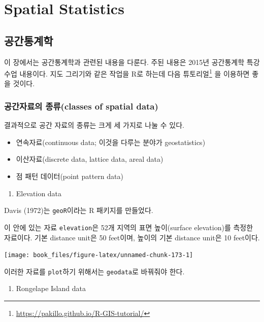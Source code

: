 \documentclass[b5paper,]{book}
\providecommand{\tightlist}{%
  \setlength{\itemsep}{0pt}\setlength{\parskip}{0pt}}
\let\rmarkdownfootnote\footnote%
\def\footnote{\protect\rmarkdownfootnote}
\renewcommand{\href}[2]{#2\footnote{\url{#1}}}
\theoremstyle{definition}
\theoremstyle{definition}
\theoremstyle{definition}
\theoremstyle{remark}
\begin{document}
\part{Spatial Statistics}\label{part-spatial-statistics}

\chapter{공간통계학}\label{spatial}

이 장에서는 공간통계학과 관련된 내용을 다룬다. 주된 내용은 2015년
공간통계학 특강 수업 내용이다. 지도 그리기와 같은 작업을 R로 하는데
\href{https://pakillo.github.io/R-GIS-tutorial/}{다음 튜토리얼} 을
이용하면 좋을 것이다.

\section{공간자료의 종류(classes of spatial
data)}\label{-classes-of-spatial-data}

결과적으로 공간 자료의 종류는 크게 세 가지로 나눌 수 있다.

\begin{itemize}
\item
  연속자료(continuous data; 이것을 다루는 분야가 geostatistics)
\item
  이산자료(discrete data, lattice data, areal data)
\item
  점 패턴 데이터(point pattern data)
\end{itemize}

\begin{enumerate}
\def\labelenumi{\arabic{enumi}.}
\tightlist
\item
  Elevation data
\end{enumerate}

Davis (1972)는 \texttt{geoR}이라는 R 패키지를 만들었다.

이 안에 있는 자료 \texttt{elevation}은 52개 지역의 표면 높이(surface
elevation)를 측정한 자료이다. 기본 distance unit은 50 feet이며, 높이의
기본 distance unit은 10 feet이다.

\begin{center}\texttt{[image: book\_files/figure-latex/unnamed-chunk-173-1]} \end{center}

이러한 자료를 \texttt{plot}하기 위해서는 \texttt{geodata}로 바꿔줘야
한다.

\begin{enumerate}
\def\labelenumi{\arabic{enumi}.}
\setcounter{enumi}{1}
\tightlist
\item
  Rongelape Island data
\end{enumerate}
\end{document}
